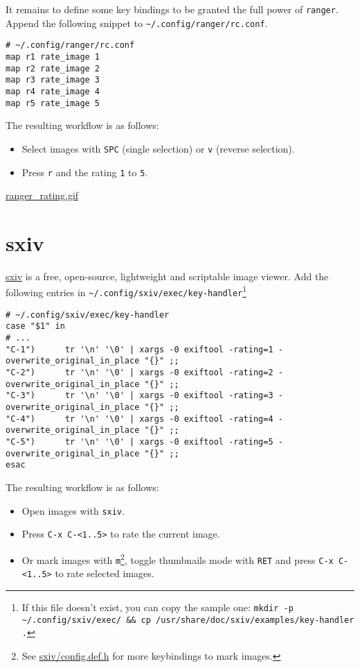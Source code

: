 \documentclass[11pt]{article}
\begin{document}
It remains to define some key bindings to be granted the full power of \texttt{ranger}.
Append the following snippet to \texttt{\textasciitilde{}/.config/ranger/rc.conf}.

\begin{verbatim}
# ~/.config/ranger/rc.conf
map r1 rate_image 1
map r2 rate_image 2
map r3 rate_image 3
map r4 rate_image 4
map r5 rate_image 5
\end{verbatim}

The resulting workflow is as follows:
\begin{itemize}
\item Select images with \texttt{SPC} (single selection) or \texttt{v} (reverse selection).
\item Press \texttt{r} and the rating \texttt{1} to \texttt{5}.
\end{itemize}
\url{ranger\_rating.gif}

\section{sxiv}
\label{sec:org32f7821}
\href{https://github.com/muennich/sxiv}{sxiv} is a free, open-source, lightweight and scriptable image viewer. 
Add the following entries in \texttt{\textasciitilde{}/.config/sxiv/exec/key-handler}\footnote{If this file doesn't exist, you can copy the sample one: \texttt{mkdir -p \textasciitilde{}/.config/sxiv/exec/ \&\& cp /usr/share/doc/sxiv/examples/key-handler .}}
\begin{verbatim}
# ~/.config/sxiv/exec/key-handler
case "$1" in
# ...
"C-1")      tr '\n' '\0' | xargs -0 exiftool -rating=1 -overwrite_original_in_place "{}" ;;
"C-2")      tr '\n' '\0' | xargs -0 exiftool -rating=2 -overwrite_original_in_place "{}" ;;
"C-3")      tr '\n' '\0' | xargs -0 exiftool -rating=3 -overwrite_original_in_place "{}" ;;
"C-4")      tr '\n' '\0' | xargs -0 exiftool -rating=4 -overwrite_original_in_place "{}" ;;
"C-5")      tr '\n' '\0' | xargs -0 exiftool -rating=5 -overwrite_original_in_place "{}" ;;
esac
\end{verbatim}

The resulting workflow is as follows:
\begin{itemize}
\item Open images with \texttt{sxiv}.
\item Press \texttt{C-x C-<1..5>} to rate the current image.
\item Or mark images with \texttt{m}\footnote{See \href{https://github.com/muennich/sxiv/blob/master/config.def.h}{sxiv/config.def.h} for more keybindings to mark images.}, toggle thumbnails mode with \texttt{RET} and press \texttt{C-x
  C-<1..5>} to rate selected images.
\end{itemize}
\end{document}
